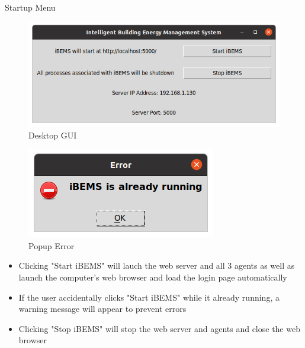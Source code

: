 \documentclass{beamer}
\begin{document}
\begin{frame}{Startup Menu}
    \begin{multicols}{2}
        \begin{figure}
            \centering
            \includegraphics[scale=0.2]{figs/BEMS_GUI_Linux.png}
            \caption{Desktop GUI}
            \label{fig:desktopgui}
        \end{figure}
        \begin{figure}
            \centering
            \includegraphics[scale=0.35]{figs/BEMS_GUI_Linux_Warning.png}
            \caption{Popup Error}
            \label{fig:popuperror}
        \end{figure}
    \end{multicols}
    \begin{block}{}
      \begin{itemize}
        \item Clicking "Start iBEMS" will lauch the web server and all 3 agents as well as launch the computer's web browser and load the login page automatically
        \item If the user accidentally clicks "Start iBEMS" while it already running, a warning message will appear to prevent errors
        \item Clicking "Stop iBEMS" will stop the web server and agents and close the web browser
    \end{itemize}
    \end{block}
\end{frame}
\end{document}
